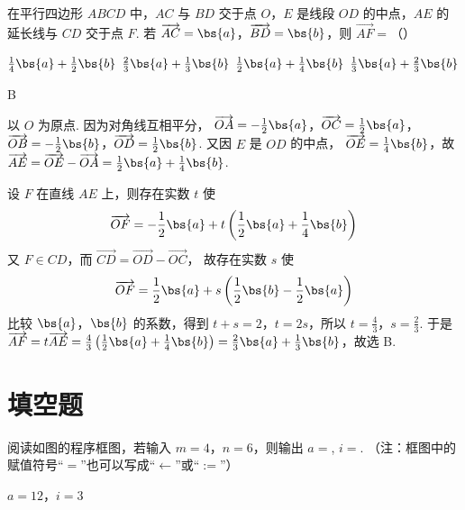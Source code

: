 \begin{problem}
在平行四边形 \(ABCD\) 中，\(AC\) 与 \(BD\) 交于点 \(O\)，\(E\) 是线段 \(OD\) 的中点，\(AE\) 的延长线与 \(CD\) 交于点 \(F\). 若 \(\overrightarrow{AC} = \bs{a}\)，\(\overrightarrow{BD} = \bs{b}\)，则 \(\overrightarrow{AF} =\)（\quad）

\choices
    {\(\frac{1}{4}\bs{a} + \frac{1}{2}\bs{b}\)}
    {\(\frac{2}{3}\bs{a} + \frac{1}{3}\bs{b}\)}
    {\(\frac{1}{2}\bs{a} + \frac{1}{4}\bs{b}\)}
    {\(\frac{1}{3}\bs{a} + \frac{2}{3}\bs{b}\)}
\end{problem}

\begin{answer}
B
\end{answer}

\begin{solution}
以 \(O\) 为原点. 因为对角线互相平分，
\(\overrightarrow{OA}=-\frac12\bs{a}\)，\(\overrightarrow{OC}=\frac12\bs{a}\)，
\(\overrightarrow{OB}=-\frac12\bs{b}\)，\(\overrightarrow{OD}=\frac12\bs{b}\).
又因 \(E\) 是 \(OD\) 的中点，
\(\overrightarrow{OE}=\frac14\bs{b}\)，故
\(\overrightarrow{AE}=\overrightarrow{OE}-\overrightarrow{OA}
=\frac12\bs{a}+\frac14\bs{b}\).

设 \(F\) 在直线 \(AE\) 上，则存在实数 \(t\) 使
\[
\overrightarrow{OF}=-\frac12\bs{a}+t\left(\frac12\bs{a}+\frac14\bs{b}\right)
\]
又 \(F\in CD\)，而 \(\overrightarrow{CD}=\overrightarrow{OD}-\overrightarrow{OC}\)，
故存在实数 \(s\) 使
\[
\overrightarrow{OF}=\frac12\bs{a}+s\left(\frac12\bs{b}-\frac12\bs{a}\right)
\]
比较 \(\bs{a}\)，\(\bs{b}\) 的系数，得到
\(t+s=2\)，\(t=2s\)，所以 \(t=\frac43\)，\(s=\frac23\).
于是
\(\overrightarrow{AF}=t\overrightarrow{AE}
=\frac43\left(\frac12\bs{a}+\frac14\bs{b}\right)
=\frac23\bs{a}+\frac13\bs{b}\)，故选 B.
\end{solution}

\section{填空题}

\begin{problem}
阅读如图的程序框图，若输入 \(m = 4\)，\(n = 6\)，则输出 \(a =\)\fillinblank{}, \(i =\)\fillinblank{}. （注：框图中的赋值符号“\(=\)”也可以写成“\(\leftarrow\)”或“\(:=\)”）

\end{problem}

\begin{answer}
\(a=12\)，\(i=3\)
\end{answer}

